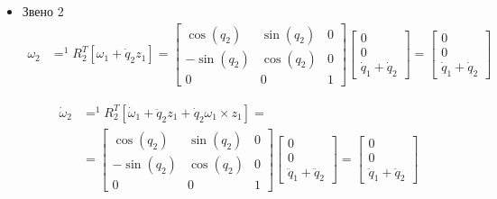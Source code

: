 \documentclass[a4paper,14pt]{extreport}
\begin{document}
\begin{itemize}
\item Звено 2
\begin{align*}
\omega_2 &= ^1R_2^T [\omega_1 + \dot q_2 z_1] = 
\left[\begin{matrix}\cos{\left (q_{2} \right )} & \sin{\left (q_{2} \right )} & 0\\- \sin{\left (q_{2} \right )} & \cos{\left (q_{2} \right )} & 0\\0 & 0 & 1\end{matrix}\right]
\left[\begin{matrix}0\\0\\\dot{q}_1 + \dot{q}_2\end{matrix}\right]
=
\left[\begin{matrix}0\\0\\\dot{q}_1 + \dot{q}_2\end{matrix}\right]
\end{align*}

\begin{align*}
\dot \omega_2 &= ^1R_2^T [\dot \omega_1 + \ddot q_2 z_1 + \dot q_2 \omega_1 \times z_1] 
=\\
&=
\left[\begin{matrix}\cos{\left (q_{2} \right )} & \sin{\left (q_{2} \right )} & 0\\- \sin{\left (q_{2} \right )} & \cos{\left (q_{2} \right )} & 0\\0 & 0 & 1\end{matrix}\right]
\left[\begin{matrix}0\\0\\\ddot{q}_1 + \ddot{q}_2\end{matrix}\right]
=
\left[\begin{matrix}0\\0\\\ddot{q}_1 + \ddot{q}_2\end{matrix}\right]
\end{align*}


\end{itemize}
\end{document}
